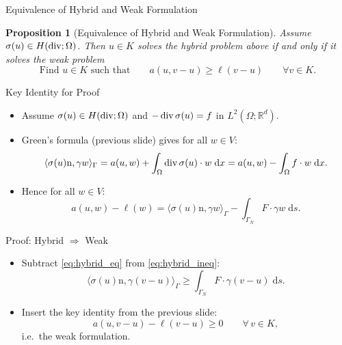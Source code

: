\documentclass[10pt,aspectratio=169]{beamer}
\newtheorem{proposition}{Proposition}[section]
\def\R{{\mathbb R}}
\def\d{{\mathrm{d}}}
\def\dx{{\d x}}
\def\ds{{\d s}}
\newcommand{\diver}{\operatornamewithlimits{div}}
\begin{document}
\begin{frame}{Equivalence of Hybrid and Weak Formulation}
	\begin{proposition}[Equivalence of Hybrid and Weak Formulation]
		Assume $\sigma(u)\in H(\diver;\Omega)$. Then $u\in K$ solves the hybrid problem above if and only if it solves the weak problem
		\begin{equation*}
			\text{Find }u\in K\text{ such that}\qquad a(u,v-u)\ge\ell(v-u)\qquad \forall v\in K.
		\end{equation*}
	\end{proposition}
\end{frame}


\begin{frame}{Key Identity for Proof}
	\begin{itemize}
		\item Assume $\sigma(u)\in H(\diver;\Omega)$ and $-\diver\sigma(u)=f$ in $L^2(\Omega;\R^d)$.
		\item Green's formula (previous slide) gives for all $w\in V$:
		      \begin{equation*}
			      \langle \sigma(u)\mathrm n,\gamma w\rangle_\Gamma
			      =
			      a(u,w)
			      +
			      \int_\Omega \diver\sigma(u)\cdot w\;\dx
			      =
			      a(u,w)-\int_\Omega f\cdot w\;\dx.
		      \end{equation*}
		\item Hence for all $w\in V$:
		      \begin{equation*}
			      a(u,w)-\ell(w)
			      =
			      \langle \sigma(u)\mathrm n,\gamma w\rangle_\Gamma
			      -
			      \int_{\Gamma_N}F\cdot \gamma w\;\ds.
		      \end{equation*}
	\end{itemize}
\end{frame}

\begin{frame}{Proof: Hybrid $\Rightarrow$ Weak}
	\begin{itemize}
		\item Subtract \eqref{eq:hybrid_eq} from \eqref{eq:hybrid_ineq}:
		      \begin{equation*}
			      \langle \sigma(u)\mathrm n,\gamma (v-u)\rangle_\Gamma
			      \ge
			      \int_{\Gamma_N}F\cdot \gamma (v-u)\;\ds.
		      \end{equation*}
		\item Insert the key identity from the previous slide:
		      \begin{equation*}
			      a(u,v-u)-\ell(v-u)\ge 0
			      \qquad\forall\,v\in K,
		      \end{equation*}
		      i.e.\ the weak formulation.
	\end{itemize}
\end{frame}
\end{document}
